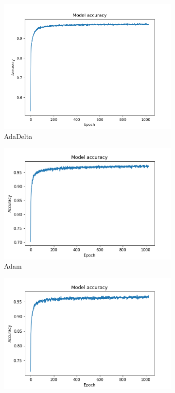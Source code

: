 \documentclass[a4paper,fleqn,usenatbib]{mnras}
\begin{document}
 
 \begin{figure}

 \begin{subfigure}{0.666\columnwidth}
 \includegraphics[width=\columnwidth]{../Figures/FNN_AdaDelta} 
 \caption{AdaDelta}
 \label{fig:AdaDelta}
 \end{subfigure}
 \begin{subfigure}{0.666\columnwidth}
 \includegraphics[width=\columnwidth]{../Figures/FNN_Adam}
 \caption{Adam}
 \label{fig:Adam}
 \end{subfigure}
 \begin{subfigure}{0.666\columnwidth}
 \includegraphics[width=\columnwidth]{../Figures/FNN_Adam_AMSGrad}

\end{subfigure}
\end{figure}
\end{document}
